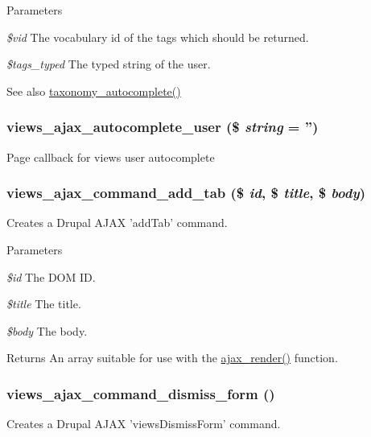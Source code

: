 \begin{DoxyParams}{Parameters}
\item[{\em \$vid}]The vocabulary id of the tags which should be returned.\item[{\em \$tags\_\-typed}]The typed string of the user.\end{DoxyParams}
\begin{DoxySeeAlso}{See also}
\hyperlink{taxonomy_8pages_8inc_ac738ea7a02da7aad1b3dbb986939c7ce}{taxonomy\_\-autocomplete()} 
\end{DoxySeeAlso}
\hypertarget{group__ajax_ga0d9404f1a04f9f5102ffac0bef92d5ab}{
\subsubsection[{views\_\-ajax\_\-autocomplete\_\-user}]{\setlength{\rightskip}{0pt plus 5cm}views\_\-ajax\_\-autocomplete\_\-user (\$ {\em string} = {\ttfamily ''})}}
\label{group__ajax_ga0d9404f1a04f9f5102ffac0bef92d5ab}
Page callback for views user autocomplete \hypertarget{group__ajax_ga9e55776de616656e252b0f9eb8851e82}{
\subsubsection[{views\_\-ajax\_\-command\_\-add\_\-tab}]{\setlength{\rightskip}{0pt plus 5cm}views\_\-ajax\_\-command\_\-add\_\-tab (\$ {\em id}, \/  \$ {\em title}, \/  \$ {\em body})}}
\label{group__ajax_ga9e55776de616656e252b0f9eb8851e82}
Creates a Drupal AJAX 'addTab' command.


\begin{DoxyParams}{Parameters}
\item[{\em \$id}]The DOM ID. \item[{\em \$title}]The title. \item[{\em \$body}]The body.\end{DoxyParams}
\begin{DoxyReturn}{Returns}
An array suitable for use with the \hyperlink{group__ajax_ga241c2426bdde049c55b05b7bf5d714a2}{ajax\_\-render()} function. 
\end{DoxyReturn}
\hypertarget{group__ajax_gac0331ece9a64afe1350f116b9c5a79f1}{
\subsubsection[{views\_\-ajax\_\-command\_\-dismiss\_\-form}]{\setlength{\rightskip}{0pt plus 5cm}views\_\-ajax\_\-command\_\-dismiss\_\-form ()}}
\label{group__ajax_gac0331ece9a64afe1350f116b9c5a79f1}
Creates a Drupal AJAX 'viewsDismissForm' command.

